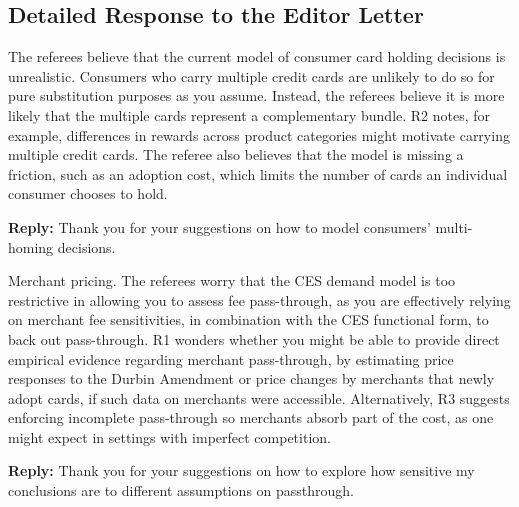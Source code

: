 \documentclass[main.tex]{subfiles}
\begin{document}
\begin{refsection}
\section*{Detailed Response to the Editor Letter}

\begin{refcommentnoclear}
    The referees believe that the current model of consumer
    card holding decisions is unrealistic.
Consumers who carry multiple credit cards
    are unlikely to do so for pure substitution purposes as you assume.
Instead, the referees believe it is more likely that the multiple cards represent a
    complementary bundle.
R2 notes, for example, differences in rewards across
    product categories might motivate carrying multiple credit cards.
The referee also
    believes that the model is missing a friction, such as an adoption cost, which
    limits the number of cards an individual consumer chooses to hold.
\end{refcommentnoclear}

\textbf{Reply:} Thank you for your suggestions on how to model consumers' multi-homing decisions.

\replymultihome

\replycomplement

\begin{refcommentnoclear}
    Merchant pricing.
The referees worry that the CES demand model is too
    restrictive in allowing you to assess fee pass-through, as you are effectively
    relying on merchant fee sensitivities, in combination with the CES functional
    form, to back out pass-through.
R1 wonders whether you might be able to provide
    direct empirical evidence regarding merchant pass-through, by estimating price
    responses to the Durbin Amendment or price changes by merchants that newly
    adopt cards, if such data on merchants were accessible.
Alternatively, R3 suggests
    enforcing incomplete pass-through so merchants absorb part of the cost, as one
    might expect in settings with imperfect competition.
\end{refcommentnoclear}

\textbf{Reply:} Thank you for your suggestions on how to explore how sensitive my conclusions are to different assumptions on passthrough.
\replypassthrough


\end{refsection}
\end{document}

